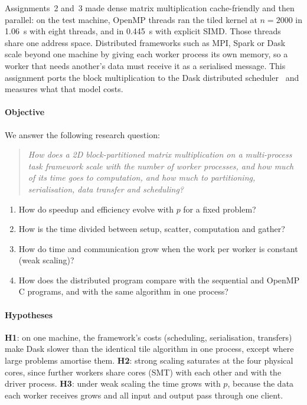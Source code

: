 \documentclass[conference,a4paper]{IEEEtran}
\begin{document}
Assignments~2 and~3 made dense matrix multiplication cache-friendly and then
parallel: on the test machine, OpenMP threads ran the tiled kernel at
$n = 2000$ in 1.06~s with eight threads, and in 0.445~s with explicit SIMD.
Those threads share one address space. Distributed frameworks such as MPI,
Spark or Dask scale beyond one machine by giving each worker process its own
memory, so a worker that needs another's data must receive it as a serialised
message. This assignment ports the block multiplication to the Dask
distributed scheduler~\cite{rocklin2015} and measures what that model costs.

\paragraph{Objective} We answer the following research question:
\begin{quote}
\emph{How does a 2D block-partitioned matrix multiplication on a multi-process
task framework scale with the number of worker processes, and how much of its
time goes to computation, and how much to partitioning, serialisation, data
transfer and scheduling?}
\end{quote}
\begin{enumerate}[label=\textbf{RQ\arabic*.}, leftmargin=3.2em, itemsep=1pt]
  \item How do speedup and efficiency evolve with $p$ for a fixed problem?
  \item How is the time divided between setup, scatter, computation and gather?
  \item How do time and communication grow when the work per worker is
        constant (weak scaling)?
  \item How does the distributed program compare with the sequential and
        OpenMP C programs, and with the same algorithm in one process?
\end{enumerate}

\paragraph{Hypotheses} \textbf{H1}: on one machine, the framework's costs
(scheduling, serialisation, transfers) make Dask slower than the identical tile
algorithm in one process, except where large problems amortise them.
\textbf{H2}: strong scaling saturates at the four physical cores, since further
workers share cores (SMT) with each other and with the driver process.
\textbf{H3}: under weak scaling the time grows with $p$, because the data each
worker receives grows and all input and output pass through one client.
\end{document}
